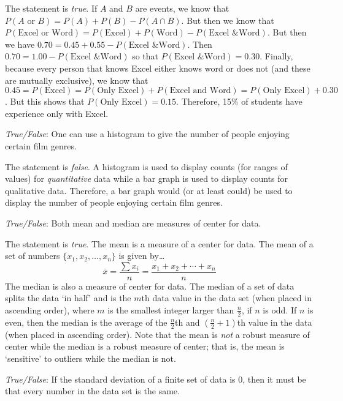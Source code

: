 \documentclass[11pt,letterpaper]{article}
\begin{document}
\sol The statement is \textit{true}. If $A$ and $B$ are events, we know that $P(A \text{ or } B)= P(A) + P(B) - P(A \cap B)$. But then we know that $P(\text{Excel or Word})= P(\text{Excel}) + P(\text{Word}) - P(\text{Excel \& Word})$. But then we have $0.70= 0.45 + 0.55 - P(\text{Excel \& Word})$. Then $0.70= 1.00 - P(\text{Excel \& Word})$ so that $P(\text{Excel \& Word})= 0.30$. Finally, because every person that knows Excel either knows word or does not (and these are mutually exclusive), we know that $0.45= P(\text{Excel})= P(\text{Only Excel}) + P(\text{Excel and Word})= P(\text{Only Excel}) + 0.30$. But this shows that $P(\text{Only Excel})= 0.15$. Therefore, 15\% of students have experience only with Excel. \pvspace{1.3cm}



\quizsol \textit{True/False}:  One can use a histogram to give the number of people enjoying certain film genres. \pspace

\sol The statement is \textit{false}. A histogram is used to display counts (for ranges of values) for \textit{quantitative} data while a bar graph is used to display counts for qualitative data. Therefore, a bar graph would (or at least could) be used to display the number of people enjoying certain film genres. \pvspace{1.3cm}



\quizsol \textit{True/False}: Both mean and median are measures of center for data. \pspace

\sol The statement is \textit{true}. The mean is a measure of a center for data. The mean of a set of numbers $\{ x_1, x_2, \ldots, x_n \}$ is given by\dots
	\[
	\overline{x}= \dfrac{\sum x_i}{n}= \dfrac{x_1 + x_2 + \cdots + x_n}{n}
	\]
The median is also a measure of center for data. The median of a set of data splits the data `in half' and is the $m$th data value in the data set (when placed in ascending order), where $m$ is the smallest integer larger than $\frac{n}{2}$, if $n$ is odd. If $n$ is even, then the median is the average of the $\frac{n}{2}$th and $(\frac{n}{2} + 1)$th value in the data (when placed in ascending order). Note that the mean is \textit{not} a robust measure of center while the median is a robust measure of center; that is, the mean is `sensitive' to outliers while the median is not. \pvspace{1.1cm}



\quizsol \textit{True/False}: If the standard deviation of a finite set of data is 0, then it must be that every number in the data set is the same. \pspace
\end{document}
